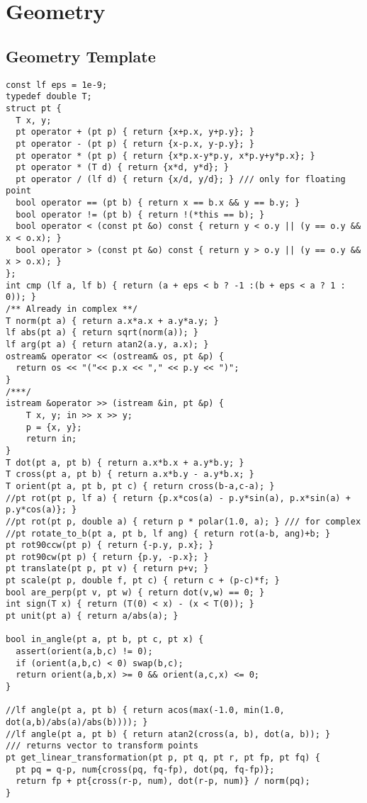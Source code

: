 \documentclass[10pt,letterpaper,twocolumn,twosided]{article}
\begin{document}

\section{Geometry}

\subsection{Geometry Template}
\begin{lstlisting}
const lf eps = 1e-9;
typedef double T;
struct pt {
  T x, y;
  pt operator + (pt p) { return {x+p.x, y+p.y}; }
  pt operator - (pt p) { return {x-p.x, y-p.y}; }
  pt operator * (pt p) { return {x*p.x-y*p.y, x*p.y+y*p.x}; }
  pt operator * (T d) { return {x*d, y*d}; }
  pt operator / (lf d) { return {x/d, y/d}; } /// only for floating point
  bool operator == (pt b) { return x == b.x && y == b.y; }
  bool operator != (pt b) { return !(*this == b); }
  bool operator < (const pt &o) const { return y < o.y || (y == o.y && x < o.x); }
  bool operator > (const pt &o) const { return y > o.y || (y == o.y && x > o.x); }
};
int cmp (lf a, lf b) { return (a + eps < b ? -1 :(b + eps < a ? 1 : 0)); }
/** Already in complex **/
T norm(pt a) { return a.x*a.x + a.y*a.y; }
lf abs(pt a) { return sqrt(norm(a)); }
lf arg(pt a) { return atan2(a.y, a.x); }
ostream& operator << (ostream& os, pt &p) {
  return os << "("<< p.x << "," << p.y << ")";
}
/***/
istream &operator >> (istream &in, pt &p) {
    T x, y; in >> x >> y;
    p = {x, y};
    return in;
}
T dot(pt a, pt b) { return a.x*b.x + a.y*b.y; }
T cross(pt a, pt b) { return a.x*b.y - a.y*b.x; }
T orient(pt a, pt b, pt c) { return cross(b-a,c-a); }
//pt rot(pt p, lf a) { return {p.x*cos(a) - p.y*sin(a), p.x*sin(a) + p.y*cos(a)}; }
//pt rot(pt p, double a) { return p * polar(1.0, a); } /// for complex
//pt rotate_to_b(pt a, pt b, lf ang) { return rot(a-b, ang)+b; }
pt rot90ccw(pt p) { return {-p.y, p.x}; }
pt rot90cw(pt p) { return {p.y, -p.x}; }
pt translate(pt p, pt v) { return p+v; }
pt scale(pt p, double f, pt c) { return c + (p-c)*f; }
bool are_perp(pt v, pt w) { return dot(v,w) == 0; }
int sign(T x) { return (T(0) < x) - (x < T(0)); }
pt unit(pt a) { return a/abs(a); }

bool in_angle(pt a, pt b, pt c, pt x) {
  assert(orient(a,b,c) != 0);
  if (orient(a,b,c) < 0) swap(b,c);
  return orient(a,b,x) >= 0 && orient(a,c,x) <= 0;
}

//lf angle(pt a, pt b) { return acos(max(-1.0, min(1.0, dot(a,b)/abs(a)/abs(b)))); }
//lf angle(pt a, pt b) { return atan2(cross(a, b), dot(a, b)); }
/// returns vector to transform points
pt get_linear_transformation(pt p, pt q, pt r, pt fp, pt fq) {
  pt pq = q-p, num{cross(pq, fq-fp), dot(pq, fq-fp)};
  return fp + pt{cross(r-p, num), dot(r-p, num)} / norm(pq);
}


\end{lstlisting}
\end{document}
